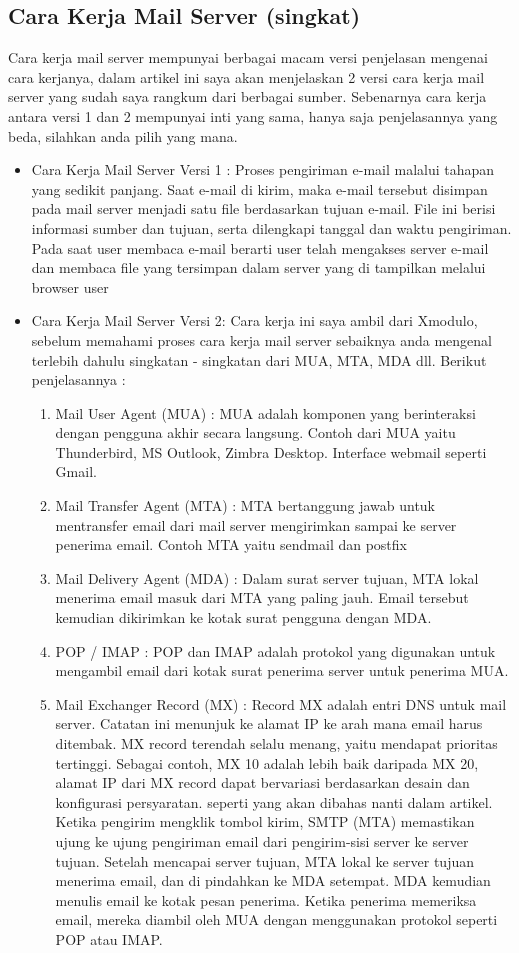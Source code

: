 \subsection {Cara Kerja Mail Server (singkat)} 
Cara kerja mail server mempunyai berbagai macam versi penjelasan mengenai cara kerjanya, dalam artikel ini saya akan menjelaskan 2 versi cara kerja mail server yang sudah saya rangkum dari berbagai sumber. Sebenarnya cara kerja antara versi 1 dan 2 mempunyai inti yang sama, hanya saja penjelasannya yang beda, silahkan anda pilih yang mana.\par  
\begin{itemize}
\item Cara Kerja Mail Server Versi 1 :
Proses pengiriman e-mail malalui tahapan yang sedikit panjang. Saat e-mail di kirim, maka e-mail tersebut disimpan pada mail server menjadi satu file berdasarkan tujuan e-mail. File ini berisi informasi sumber dan tujuan, serta dilengkapi tanggal dan waktu pengiriman. Pada saat user membaca e-mail berarti user telah mengakses server e-mail dan membaca file yang tersimpan dalam server yang di tampilkan melalui browser user 
\item Cara Kerja Mail Server Versi 2:
Cara kerja ini saya ambil dari Xmodulo, sebelum memahami proses cara kerja mail server sebaiknya anda mengenal terlebih dahulu singkatan - singkatan dari MUA, MTA, MDA dll. Berikut penjelasannya : 
\begin{enumerate}
\item Mail User Agent (MUA) : MUA adalah komponen yang berinteraksi dengan pengguna akhir secara langsung. Contoh dari MUA yaitu Thunderbird, MS Outlook, Zimbra Desktop. Interface webmail seperti Gmail. 
\item Mail Transfer Agent (MTA) : MTA bertanggung jawab untuk mentransfer email dari mail server mengirimkan sampai ke server penerima email. Contoh MTA yaitu sendmail dan postfix 
\item Mail Delivery Agent (MDA) : Dalam surat server tujuan, MTA lokal menerima email masuk dari MTA yang paling jauh. Email tersebut kemudian dikirimkan ke kotak surat pengguna dengan MDA. 
\item POP / IMAP : POP dan IMAP adalah protokol yang digunakan untuk mengambil email dari kotak surat penerima server untuk penerima MUA. 
\item Mail Exchanger Record (MX) : Record MX adalah entri DNS untuk mail server. Catatan ini menunjuk ke alamat IP ke arah mana email harus ditembak. MX record terendah selalu menang, yaitu mendapat prioritas tertinggi. Sebagai contoh, MX 10 adalah lebih baik daripada MX 20, alamat IP dari MX record dapat bervariasi berdasarkan desain dan konfigurasi persyaratan. seperti yang akan dibahas nanti dalam artikel.
Ketika pengirim mengklik tombol kirim, SMTP (MTA) memastikan ujung ke ujung pengiriman email dari pengirim-sisi server ke server tujuan. Setelah mencapai server tujuan, MTA lokal ke server tujuan menerima email, dan di pindahkan ke MDA setempat. MDA kemudian menulis email ke kotak pesan penerima. Ketika penerima memeriksa email, mereka diambil oleh MUA dengan menggunakan protokol seperti POP atau IMAP. 
\end{enumerate}
\end{itemize}

